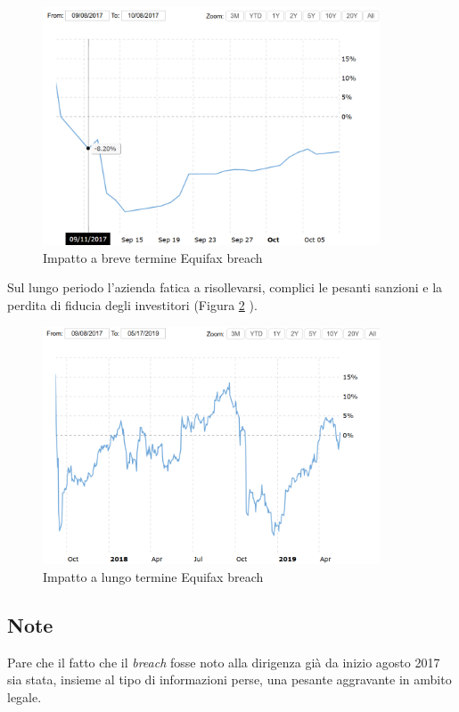 \documentclass[12pt,a4paper,twoside]{report}
\begin{document}
\begin{figure}[H] 
\begin{center} 
\includegraphics[width=10cm]{figures/equifax_short.png} 
\caption[Grafico Equifax short]{Impatto a breve termine Equifax breach}\label{fig:eqx1}
\end{center}
\end{figure}

Sul lungo periodo l'azienda fatica a risollevarsi, complici le pesanti sanzioni e la perdita di fiducia degli investitori (Figura \ref{fig:eqx2} \cite{macrotrends_equifax}).\\

\begin{figure}[H] 
\begin{center} 
\includegraphics[width=10cm]{figures/equifax_long.png} 
\caption[Grafico Equifax long]{Impatto a lungo termine Equifax breach}\label{fig:eqx2}
\end{center}
\end{figure}

\subsection{Note}
Pare che il fatto che il \textit{breach} fosse noto alla dirigenza gi\`a da inizio agosto 2017 \cite{Uber_plusEquifaxAndYahoo} sia stata, insieme al tipo di informazioni perse, una pesante aggravante in ambito legale.\\
\end{document}
